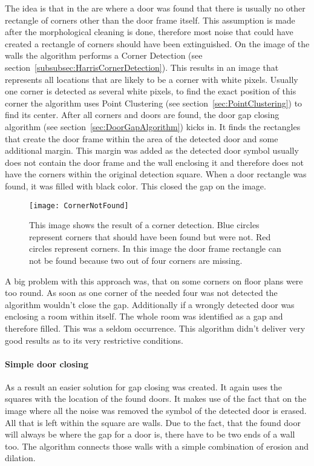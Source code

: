 The idea is that in the are where a door was found that there is usually no other rectangle of corners other than the door frame itself. This assumption is made after the morphological cleaning is done, therefore most noise that could have created a rectangle of corners should have been extinguished. On the image of the walls the algorithm performs a Corner Detection (see section~\ref{subsubsec:HarrisCornerDetection}). This results in an image that represents all locations that are likely to be a corner with white pixels. Usually one corner is detected as several white pixels, to find the exact position of this corner the algorithm uses Point Clustering (see section~\ref{sec:PointClustering}) to find its center. After all corners and doors are found, the door gap closing algorithm (see section~\ref{sec:DoorGapAlgorithm}) kicks in. It finds the rectangles that create the door frame within the area of the detected door and some additional margin. This margin was added as the detected door symbol usually does not contain the door frame and the wall enclosing it and therefore does not have the corners within the original detection square.
When a door rectangle was found, it was filled with black color. This closed the gap on the image.

\begin{figure}[H]
	\centering
	\texttt{[image: CornerNotFound]}
	\caption{This image shows the result of a corner detection. Blue circles represent corners that should have been found but were not. Red circles represent corners. In this image the door frame rectangle can not be found because two out of four corners are missing.}
	\label{fig:CornerNotFound}
\end{figure}

A big problem with this approach was, that on some corners on floor plans were too round. As soon as one corner of the needed four was not detected the algorithm wouldn't close the gap. Additionally if a wrongly detected door was enclosing a room within itself. The whole room was identified as a gap and therefore filled. This was a seldom occurrence. This algorithm didn't deliver very good results as to its very restrictive conditions.

\paragraph{Simple door closing}
As a result an easier solution for gap closing was created. It again uses the squares with the location of the found doors. It makes use of the fact that on the image where all the noise was removed the symbol of the detected door is erased. All that is left within the square are walls. Due to the fact, that the found door will always be where the gap for a door is, there have to be two ends of a wall too. The algorithm connects those walls with a simple combination of erosion and dilation.

